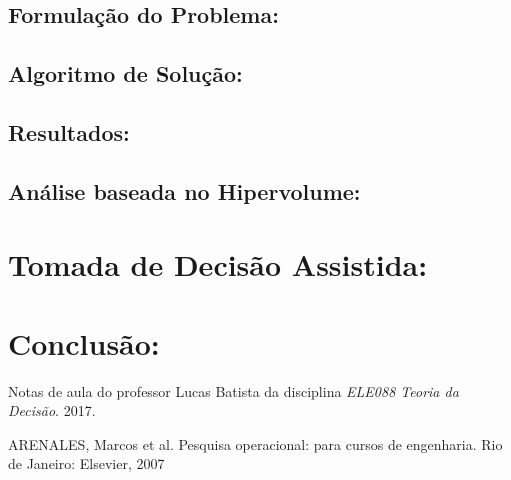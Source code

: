 \documentclass[conference]{IEEEtran}
\begin{document}
\subsection{Formulação do Problema:}


\subsection{Algoritmo de Solução:}


\subsection{Resultados:}


\subsection{Análise baseada no Hipervolume:}


\section{Tomada de Decisão Assistida:}


\section{Conclusão:}


\begin{thebibliography}{1}

Notas de aula do professor Lucas Batista da disciplina \emph{ELE088 Teoria da Decisão}. 2017.

ARENALES, Marcos et al. Pesquisa operacional: para cursos de engenharia. Rio de Janeiro: Elsevier, 2007

\end{thebibliography}


\end{document}
